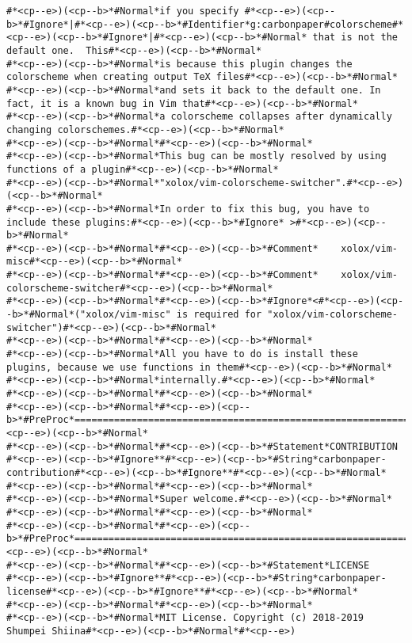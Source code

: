 \begin{lstlisting}[style=carbonpaper]
#*<cp--e>)(<cp--b>*#Normal*if you specify #*<cp--e>)(<cp--b>*#Ignore*|#*<cp--e>)(<cp--b>*#Identifier*g:carbonpaper#colorscheme#*<cp--e>)(<cp--b>*#Ignore*|#*<cp--e>)(<cp--b>*#Normal* that is not the default one.  This#*<cp--e>)(<cp--b>*#Normal*
#*<cp--e>)(<cp--b>*#Normal*is because this plugin changes the colorscheme when creating output TeX files#*<cp--e>)(<cp--b>*#Normal*
#*<cp--e>)(<cp--b>*#Normal*and sets it back to the default one. In fact, it is a known bug in Vim that#*<cp--e>)(<cp--b>*#Normal*
#*<cp--e>)(<cp--b>*#Normal*a colorscheme collapses after dynamically changing colorschemes.#*<cp--e>)(<cp--b>*#Normal*
#*<cp--e>)(<cp--b>*#Normal*#*<cp--e>)(<cp--b>*#Normal*
#*<cp--e>)(<cp--b>*#Normal*This bug can be mostly resolved by using functions of a plugin#*<cp--e>)(<cp--b>*#Normal*
#*<cp--e>)(<cp--b>*#Normal*"xolox/vim-colorscheme-switcher".#*<cp--e>)(<cp--b>*#Normal*
#*<cp--e>)(<cp--b>*#Normal*In order to fix this bug, you have to include these plugins:#*<cp--e>)(<cp--b>*#Ignore* >#*<cp--e>)(<cp--b>*#Normal*
#*<cp--e>)(<cp--b>*#Normal*#*<cp--e>)(<cp--b>*#Comment*    xolox/vim-misc#*<cp--e>)(<cp--b>*#Normal*
#*<cp--e>)(<cp--b>*#Normal*#*<cp--e>)(<cp--b>*#Comment*    xolox/vim-colorscheme-switcher#*<cp--e>)(<cp--b>*#Normal*
#*<cp--e>)(<cp--b>*#Normal*#*<cp--e>)(<cp--b>*#Ignore*<#*<cp--e>)(<cp--b>*#Normal*("xolox/vim-misc" is required for "xolox/vim-colorscheme-switcher")#*<cp--e>)(<cp--b>*#Normal*
#*<cp--e>)(<cp--b>*#Normal*#*<cp--e>)(<cp--b>*#Normal*
#*<cp--e>)(<cp--b>*#Normal*All you have to do is install these plugins, because we use functions in them#*<cp--e>)(<cp--b>*#Normal*
#*<cp--e>)(<cp--b>*#Normal*internally.#*<cp--e>)(<cp--b>*#Normal*
#*<cp--e>)(<cp--b>*#Normal*#*<cp--e>)(<cp--b>*#Normal*
#*<cp--e>)(<cp--b>*#Normal*#*<cp--e>)(<cp--b>*#PreProc*==============================================================================#*<cp--e>)(<cp--b>*#Normal*
#*<cp--e>)(<cp--b>*#Normal*#*<cp--e>)(<cp--b>*#Statement*CONTRIBUTION                                        #*<cp--e>)(<cp--b>*#Ignore**#*<cp--e>)(<cp--b>*#String*carbonpaper-contribution#*<cp--e>)(<cp--b>*#Ignore**#*<cp--e>)(<cp--b>*#Normal*
#*<cp--e>)(<cp--b>*#Normal*#*<cp--e>)(<cp--b>*#Normal*
#*<cp--e>)(<cp--b>*#Normal*Super welcome.#*<cp--e>)(<cp--b>*#Normal*
#*<cp--e>)(<cp--b>*#Normal*#*<cp--e>)(<cp--b>*#Normal*
#*<cp--e>)(<cp--b>*#Normal*#*<cp--e>)(<cp--b>*#PreProc*==============================================================================#*<cp--e>)(<cp--b>*#Normal*
#*<cp--e>)(<cp--b>*#Normal*#*<cp--e>)(<cp--b>*#Statement*LICENSE                                                  #*<cp--e>)(<cp--b>*#Ignore**#*<cp--e>)(<cp--b>*#String*carbonpaper-license#*<cp--e>)(<cp--b>*#Ignore**#*<cp--e>)(<cp--b>*#Normal*
#*<cp--e>)(<cp--b>*#Normal*#*<cp--e>)(<cp--b>*#Normal*
#*<cp--e>)(<cp--b>*#Normal*MIT License. Copyright (c) 2018-2019 Shumpei Shiina#*<cp--e>)(<cp--b>*#Normal*#*<cp--e>)
\end{lstlisting}

